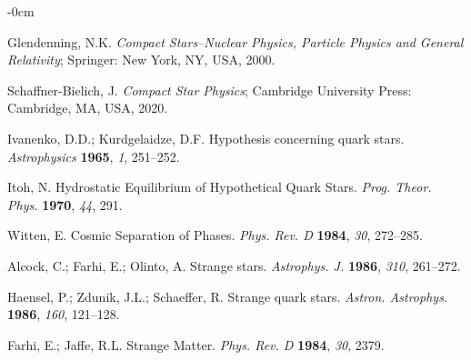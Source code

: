 \documentclass[universe,article,accept,moreauthors,pdftex]{Definitions/mdpi}
\begin{document}
\begin{adjustwidth}{-\extralength}{0cm}

\printendnotes[custom] %



\begin{thebibliography}{999}

  Glendenning, N.K. 
  {\it Compact Stars--Nuclear Physics, Particle Physics and General Relativity}; 
  Springer:  New York, NY, USA, 2000.  %


Schaffner-Bielich, J. 
{\it Compact Star Physics}; 
Cambridge University Press: Cambridge, MA, USA,  2020.%

  
Ivanenko, D.D.; Kurdgelaidze, D.F. 
Hypothesis concerning quark stars. 
\emph{Astrophysics} \textbf{1965}, \emph{1}, 251--252.

Itoh, N. 
Hydrostatic Equilibrium of Hypothetical Quark Stars. 
\emph{Prog. Theor. Phys.} \textbf{1970}, \emph{44},  291.

Witten, E. 
Cosmic Separation of Phases. 
\emph{Phys. Rev. D} \textbf{1984}, \emph{30}, 272--285.

Alcock, C.; Farhi, E.; Olinto, A. 
Strange stars. 
\emph{Astrophys. J.} \textbf{1986}, \emph{310},  261--272.

Haensel, P.; Zdunik, J.L.; Schaeffer, R. 
Strange quark stars. 
\emph{Astron. Astrophys.} \textbf{1986}, \emph{160}, 121--128.

Farhi, E.; Jaffe, R.L. 
Strange Matter. 
\emph{Phys. Rev. D} \textbf{1984}, \emph{30}, 2379.


\end{thebibliography}
\end{adjustwidth}
\end{document}
